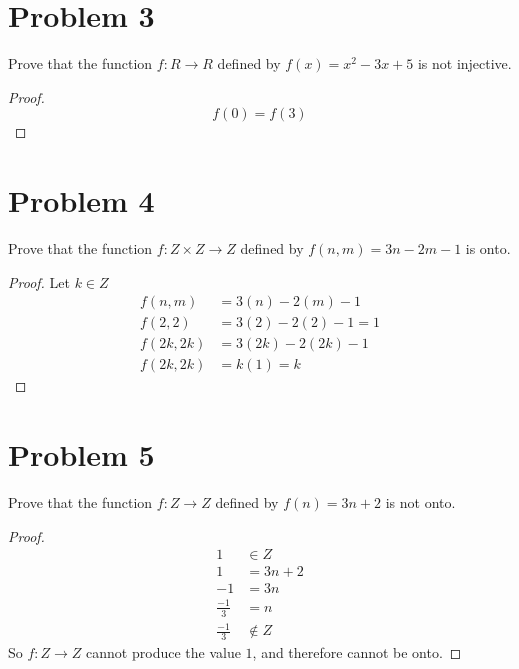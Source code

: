 \documentclass{article}
\newenvironment{problem}[1]{
  \nobreak\section*{Problem #1}
}{}
\begin{document}
  \begin{problem}{3}
    Prove that the function $f : R \rightarrow R$ defined by $f(x) = x^{2} - 3x + 5$ is not injective.
    \begin{proof}
      \begin{equation*}
        f(0) = f(3)
      \end{equation*}
    \end{proof}
  \end{problem}

  \begin{problem}{4}
    Prove that the function $f : Z \times Z \rightarrow Z$ defined by $f(n, m) = 3n - 2m - 1$ is onto.
    \begin{proof}
      Let $k \in Z$
      \begin{equation*}
        \begin{split}
          f(n, m) & = 3(n) - 2(m) - 1\\
          f(2, 2) & = 3(2) - 2(2) - 1 = 1\\
          f(2k, 2k) & = 3(2k) - 2(2k) - 1\\
          f(2k, 2k) & = k(1) = k
        \end{split}
      \end{equation*}
    \end{proof}
  \end{problem}

  \begin{problem}{5}
    Prove that the function $f : Z \rightarrow Z$ defined by $f(n) = 3n + 2$ is not onto.
    \begin{proof}
      \begin{equation*}
        \begin{split}
          1 & \in Z\\
          1 & = 3n + 2\\
          -1 & = 3n\\
          \frac{-1}{3} & = n\\
          \frac{-1}{3} & \notin Z
        \end{split}
      \end{equation*}
      So $f : Z \rightarrow Z$ cannot produce the value $1$, and therefore cannot be onto.
    \end{proof}
  \end{problem}
\end{document}
